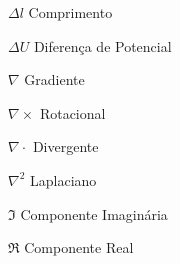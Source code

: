 \documentclass[12pt,twoside,oneright,a4paper,chapter=TITLE,english,brazil]{unipampa}
\begin{document}
\begin{simbolos}
\begin{multicols}{2}
    \item[$\Delta l$]                Comprimento
    \item[$\Delta U$]                Diferença de Potencial
    \item[$\nabla$]                  Gradiente
    \item[$\nabla \times$]           Rotacional
    \item[$\nabla \cdot$]            Divergente
    \item[$\nabla^2$]                Laplaciano
    \item[$\Im$]                     Componente Imaginária 
    \item[$\Re$]                     Componente Real
    \end{multicols}                                                   
\end{simbolos}


\tableofcontents       %


%
%
\textual                    %
\pagestyle{simple}          %
\OnehalfSpacing             %
\end{document}
